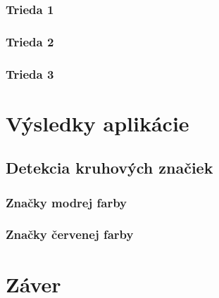 \documentclass[12pt]{article}
\begin{document}
\subsubsection{Trieda 1}
\subsubsection{Trieda 2}
\subsubsection{Trieda 3}

\section{Výsledky aplikácie}
\subsection{Detekcia kruhových značiek}
\subsubsection{Značky modrej farby}
\subsubsection{Značky červenej farby}

\section{Záver}



\end{document}
